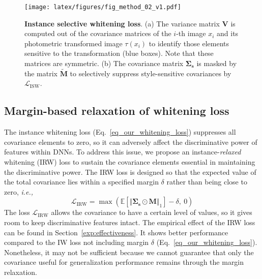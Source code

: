 \documentclass[final]{latex/cvpr}
\begin{document}
\begin{figure*}[ht!]
\vspace*{-0.0cm}
  \centering\texttt{[image: latex/figures/fig\_method\_02\_v1.pdf]}
  \vspace*{-0.0cm}
  \caption{\textbf{Instance selective whitening loss}. 
  (a) 
  The variance matrix $\mathbf{V}$ is computed out of the covariance matrices of the $i$-th image $x_i$ and its photometric transformed image $\tau(x_i)$ to identify those elements sensitive to the transformation (blue boxes).
  Note that these matrices are symmetric.
  (b) The covariance matrix $\mathbf{\Sigma_s}$ is masked by the matrix $\mathbf{\tilde{M}}$ to selectively suppress style-sensitive covariances by $\mathcal{L}_{\text{ISW}}$.
}
\label{fig:disentangling_covariance}
\vspace{-0.45cm}
\end{figure*}









\vspace*{-0.18cm}
\subsection{Margin-based relaxation of whitening loss}
\vspace*{-0.12cm}
The instance whitening loss (Eq.~\eqref{eq_our_whitening_loss}) suppresses all covariance elements to zero, so it can adversely affect the discriminative power of features within DNNs. To address this issue, we propose an instance-\emph{relaxed} whitening (IRW) loss to sustain the covariance elements essential in maintaining the discriminative power. The IRW loss is designed so that the expected value of the total covariance lies within a specified margin $\delta$ rather than being close to zero, \textit{i.e.,} 
\begin{equation} \label{eq_our_whitening_loss_with_margin}
\mathcal{L}_{\text{IRW}} = \max(\mathbb{E}[\Vert\mathbf{\Sigma_s}\odot\mathbf{M}\Vert_1]-\delta, \ 0)
\end{equation}
The loss $\mathcal{L}_{\text{IRW}}$ allows the covariance to have a certain level of values, so it gives room to keep discriminative features intact. The empirical effect of the IRW loss can be found in Section~\ref{exp:effectiveness}. It shows better performance compared to the IW loss not including margin $\delta$ (Eq.~\eqref{eq_our_whitening_loss}). Nonetheless, it may not be sufficient because we cannot guarantee that only the covariance useful for generalization performance remains through the margin relaxation.
\end{document}
